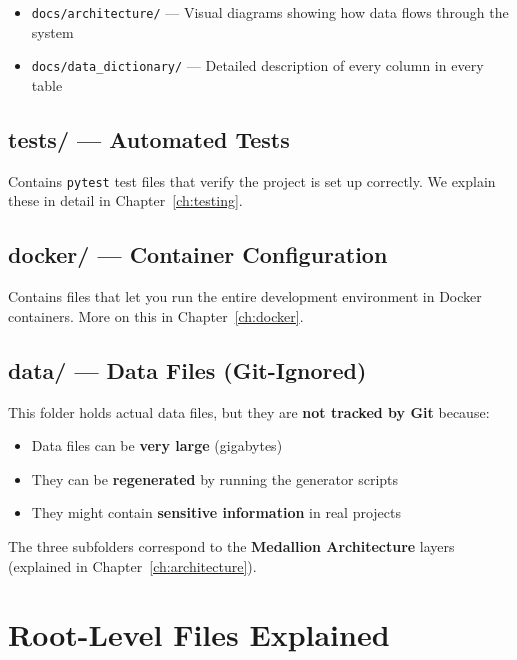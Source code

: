 \documentclass[12pt, a4paper, oneside]{report}
\begin{document}
\begin{itemize}
    \item \texttt{docs/architecture/} --- Visual diagrams showing how data flows through the system
    \item \texttt{docs/data\_dictionary/} --- Detailed description of every column in every table
\end{itemize}

\subsection{tests/ --- Automated Tests}

Contains \texttt{pytest} test files that verify the project is set up correctly. We explain these in detail in Chapter~\ref{ch:testing}.

\subsection{docker/ --- Container Configuration}

Contains files that let you run the entire development environment in Docker containers. More on this in Chapter~\ref{ch:docker}.

\subsection{data/ --- Data Files (Git-Ignored)}

This folder holds actual data files, but they are \textbf{not tracked by Git} because:
\begin{itemize}
    \item Data files can be \textbf{very large} (gigabytes)
    \item They can be \textbf{regenerated} by running the generator scripts
    \item They might contain \textbf{sensitive information} in real projects
\end{itemize}

The three subfolders correspond to the \textbf{Medallion Architecture} layers (explained in Chapter~\ref{ch:architecture}).

\section{Root-Level Files Explained}
\end{document}
